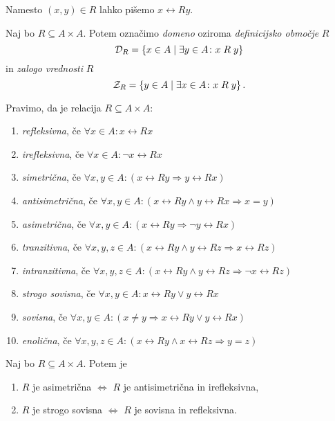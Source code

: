 \documentclass[12pt, a4paper]{article}
\renewcommand{\implies}{\Rightarrow}
\renewcommand{\iff}{\Leftrightarrow}
\begin{document}
Namesto $(x,y)\in R$ lahko pišemo $x\rel{R}y$.

\begin{definicija}
Naj bo $R\subseteq A\times A$. Potem označimo \emph{domeno} oziroma \emph{definicijsko območje} $R$
\[
\mathcal{D}_R=\left\{x\in A\mid \exists y\in A\colon x\mathrel{R}y\right\}
\]
in \emph{zalogo vrednosti} $R$
\[
\mathcal{Z}_R=\left\{y\in A\mid \exists x\in A\colon x\mathrel{R}y\right\}.
\]
\end{definicija}

\begin{definicija}
Pravimo, da je relacija $R\subseteq A\times A$:

\begin{enumerate}
\item \emph{refleksivna}, če $\forall x\in A\colon x\rel{R}x$
\item \emph{irefleksivna}, če $\forall x\in A\colon\neg x\rel{R}x$
\item \emph{simetrična}, če $\forall x,y\in A\colon(x\rel{R}y\implies y\rel{R}x)$
\item \emph{antisimetrična}, če $\forall x,y\in A\colon(x\rel{R}y\land y\rel{R}x\implies x=y)$
\item \emph{asimetrična}, če $\forall x,y\in A\colon(x\rel{R}y\implies\neg y\rel{R}x)$
\item \emph{tranzitivna}, če $\forall x,y,z\in A\colon(x\rel{R}y\land y\rel{R}z\implies x\rel{R}z)$
\item \emph{intranzitivna}, če $\forall x,y,z\in A\colon(x\rel{R}y\land y\rel{R}z\implies \neg x\rel{R}z)$
\item \emph{strogo sovisna}, če $\forall x,y\in A\colon x\rel{R}y\lor y\rel{R}x$
\item \emph{sovisna}, če $\forall x,y\in A\colon(x\ne y\implies x\rel{R}y\lor y\rel{R}x)$
\item \emph{enolična}, če $\forall x,y,z\in A\colon(x\rel{R}y\land x\rel{R}z\implies y=z)$
\end{enumerate}
\end{definicija}

\begin{trditev}
Naj bo $R\subseteq A\times A$. Potem je

\begin{enumerate}
\item $R$ je asimetrična $\iff$ $R$ je antisimetrična in irefleksivna,
\item $R$ je strogo sovisna $\iff$ $R$ je sovisna in refleksivna.
\end{enumerate}
\end{trditev}
\end{document}
